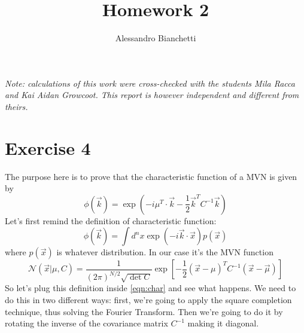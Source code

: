 \documentclass[a4paper,11pt,fleqn]{article}
\title{Homework 2}
\author{Alessandro Bianchetti}
\begin{document}
\maketitle
\textit{Note: calculations of this work were cross-checked with the students Mila Racca and Kai Aidan Growcoot. 
This report is however independent and different from theirs.}

\section{Exercise 4}
The purpose here is to prove that the characteristic function of a MVN is given by
\begin{equation}
    \phi(\vec{k}) = \exp{(-i\mu^T\cdot \vec{k}-\frac{1}{2}\vec{k}^T C^{-1}\vec{k})}
\end{equation}
Let's first remind the definition of characteristic function:
\begin{equation}
    \label{eqn:char}
    \phi(\vec{k}) = \int d^nx \exp{(-i\vec{k}\cdot \vec{x}) p(\vec{x})}
\end{equation}
where $p(\vec{x})$ is whatever distribution. In our case it's the MVN function
\begin{equation}
    \mathcal{N}(\vec{x}|\mu, C) = \frac{1}{(2\pi)^{N/2}\sqrt{\det{C}}} \exp{\left[-\frac{1}{2}(\vec{x}-\mu)^T C^{-1} (\vec{x}-\vec{\mu})\right]}
\end{equation}
So let's plug this definition inside \ref{eqn:char} and see what happens. We need to 
do this in two different ways: first, we're going to apply the square completion 
technique, thus solving the Fourier Transform. Then we're going to do it by rotating
the inverse of the covariance matrix $C^{-1}$ making it diagonal.
\end{document}
